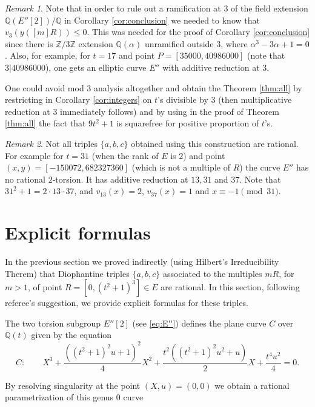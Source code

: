 \documentclass[11pt]{amsart}
\theoremstyle{plain}
\theoremstyle{remark}
\newtheorem{remark}{Remark}
\begin{document}
\begin{remark}
Note that in order to rule out a ramification at $3$ of the field extension $\mathbb{Q}(E''[2])/\mathbb{Q}$ in Corollary \ref{cor:conclusion} we needed to know that $v_3( y([m]R)) \le 0$. This was needed for the proof of Corollary \ref{cor:conclusion} since there is $\mathbb{Z}/3\mathbb{Z}$ extension $\mathbb{Q}(\alpha)$ unramified outside $3$, where $\alpha^3-3\alpha+1=0$. Also, for example, for $t=17$ and point $P=[35000, 40986000]$ (note that $3|40986000$), one gets an elliptic curve $E''$ with additive reduction at $3$.

One could avoid mod $3$ analysis altogether and obtain the Theorem \ref{thm:all} by restricting in Corollary \ref{cor:integers} on $t$'s divisible by $3$ (then multiplicative reduction at $3$ immediately follows) and by using in the proof of Theorem \ref{thm:all} the fact that $9t^2+1$ is squarefree for positive proportion of $t$'s.
\end{remark}

\begin{remark}
Not all triples $\{a,b,c\}$ obtained using this construction are rational.
For example for $t=31$ (when the rank of $E$ is $2$) %
and point $(x,y)=[-150072,682327360]$ (which is not a multiple of $R$) %
the curve $E''$ has no rational $2$-torsion. It has additive reduction at $13, 31$ and $37$. Note that $31^2+1=2\cdot 13 \cdot 37$, and $v_{13}(x)=2$, $v_{37}(x)=1$ and $x \equiv -1 \pmod{31}$.
\end{remark}

\section{Explicit formulas}

In the previous section we proved indirectly (using Hilbert's Irreducibility Therem) that Diophantine triples $\{a,b,c \}$ associated to the multiples $mR$, for $m>1$, of point $R=[0,(t^2+1)^3] \in E$ are rational. In this section, following referee's suggestion, we provide explicit formulas for these triples.

The two torsion subgroup $E''[2]$ (see \eqref{eq:E''}) defines the plane curve $C$ over $\mathbb{Q}(t)$ given by the equation
\[
C: \qquad X^3+\frac{((t^2+1)^2u+1)^2}{4}X^2+\frac{t^2((t^2+1)^2u^2+u)}{2} X + \frac{t^4u^2}{4}=0.
\]

By resolving singularity at the point $(X,u)=(0,0)$ we obtain a rational parametrization of this genus $0$ curve
\end{document}
